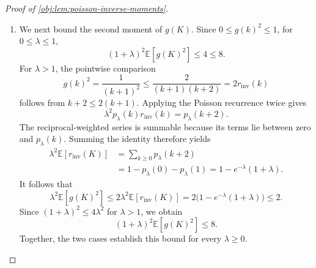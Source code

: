 \documentclass[11pt]{article}
\begin{document}
\begin{proof}[Proof of \cref{obj:lem:poisson-inverse-moments}]
\begin{enumerate}
Cauchy--Schwarz and expansion of the squares give
\[
\left|
\mathbb E[f_{\mathrm{aux},N_{\mathrm{cut}}}(K)]
-\mathbb E[f_{\mathrm{aux}}(K)]
\right|
\le
\sqrt{\mathbb E\bigl[(e^{\mathrm{val}}_{N_{\mathrm{cut}}}(K))^2\bigr]},
\]
\[
\begin{aligned}
&\left|
\mathbb E[f_{\mathrm{aux},N_{\mathrm{cut}}}(K)^2]
-\mathbb E[f_{\mathrm{aux}}(K)^2]
\right|\\
&\quad\le
\mathbb E\bigl[(e^{\mathrm{val}}_{N_{\mathrm{cut}}}(K))^2\bigr]
+2\sqrt{
\mathbb E[f_{\mathrm{aux}}(K)^2]\,
\mathbb E\bigl[(e^{\mathrm{val}}_{N_{\mathrm{cut}}}(K))^2\bigr]},
\end{aligned}
\]
and
\[
\begin{aligned}
&\left|
\mathbb E[(\Delta f_{\mathrm{aux},N_{\mathrm{cut}}}(K))^2]
-\mathbb E[(\Delta f_{\mathrm{aux}}(K))^2]
\right|\\
&\quad\le
\mathbb E\bigl[(e^{\mathrm{inc}}_{N_{\mathrm{cut}}}(K))^2\bigr]
+2\sqrt{
\mathbb E[(\Delta f_{\mathrm{aux}}(K))^2]\,
\mathbb E\bigl[(e^{\mathrm{inc}}_{N_{\mathrm{cut}}}(K))^2\bigr]}.
\end{aligned}
\]
Hence both the variance and the expected squared increment of the truncations converge to those of \(f_{\mathrm{aux}}\). Passing to the limit in the finite-support inequality proves
\[
\operatorname{Var}(f_{\mathrm{aux}}(K))
\le\lambda\,\mathbb E[(\Delta f_{\mathrm{aux}}(K))^2].
\]
Applying this to \(g\), with the square-integrability established above, gives
\[
\operatorname{Var}(g(K))
\le\lambda\,\mathbb E[r_{\mathrm{inv}}(K)^2].
\] %

\item We next bound the second moment of \(g(K)\). Since \(0\le g(k)^2\le1\), for \(0\le\lambda\le1\),
\[
(1+\lambda)^2\mathbb E[g(K)^2]\le4\le8.
\]
For \(\lambda>1\), the pointwise comparison
\[
g(k)^2=\frac1{(k+1)^2}
\le\frac2{(k+1)(k+2)}
=2r_{\mathrm{inv}}(k)
\]
follows from \(k+2\le2(k+1)\). Applying the Poisson recurrence twice gives
\[
\lambda^2p_\lambda(k)r_{\mathrm{inv}}(k)=p_\lambda(k+2).
\]
The reciprocal-weighted series is summable because its terms lie between zero and \(p_\lambda(k)\). Summing the identity therefore yields
\[
\begin{aligned}
\lambda^2\mathbb E[r_{\mathrm{inv}}(K)]
&=\sum_{k\ge0}p_\lambda(k+2)\\
&=1-p_\lambda(0)-p_\lambda(1)
=1-e^{-\lambda}(1+\lambda).
\end{aligned}
\]
It follows that
\[
\lambda^2\mathbb E[g(K)^2]
\le2\lambda^2\mathbb E[r_{\mathrm{inv}}(K)]
=2\bigl(1-e^{-\lambda}(1+\lambda)\bigr)
\le2.
\]
Since \((1+\lambda)^2\le4\lambda^2\) for \(\lambda>1\), we obtain
\[
(1+\lambda)^2\mathbb E[g(K)^2]\le8.
\]
Together, the two cases establish this bound for every \(\lambda\ge0\). %


\end{enumerate}
\end{proof}
\end{document}

